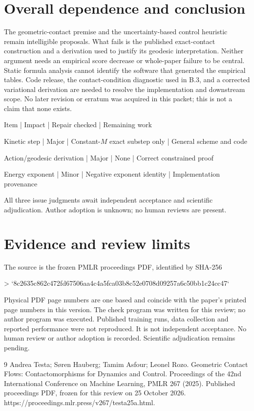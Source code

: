 \documentclass[10pt]{article}
\begin{document}
\section*{Overall dependence and conclusion}
The geometric-contact premise and the uncertainty-based control heuristic remain intelligible proposals. What fails is the published exact-contact construction and a derivation used to justify its geodesic interpretation. Neither argument needs an empirical score decrease or whole-paper failure to be central. Static formula analysis cannot identify the software that generated the empirical tables. Code release, the contact-condition diagnostic used in B.3, and a corrected variational derivation are needed to resolve the implementation and downstream scope. No later revision or erratum was acquired in this packet; this is not a claim that none exists.\par
Item | Impact | Repair checked | Remaining work\par
Kinetic step | Major | Constant-\(M\) exact substep only | General scheme and code\par
Action/geodesic derivation | Major | None | Correct constrained proof\par
Energy exponent | Minor | Negative exponent identity | Implementation provenance\par
All three issue judgments await independent acceptance and scientific adjudication. Author adoption is unknown; no human reviews are present.\par
\section*{Evidence and review limits}
The source is the frozen PMLR proceedings PDF, identified by SHA-256\par
> `8c2635c862c472fd67506aa4c4a5fca03b8c52e0708d09257a6c50bb1c24cc47`\par
Physical PDF page numbers are one based and coincide with the paper’s printed page numbers in this version. The check program was written for this review; no author program was executed. Published training runs, data collection and reported performance were not reproduced. It is not independent acceptance. No human review or author adoption is recorded. Scientific adjudication remains pending.\par
9 Andrea Testa; Søren Hauberg; Tamim Asfour; Leonel Rozo. Geometric Contact Flows: Contactomorphisms for Dynamics and Control. Proceedings of the 42nd International Conference on Machine Learning, PMLR 267 (2025). Published proceedings PDF, frozen for this review on 25 October 2026. https://proceedings.mlr.press/v267/testa25a.html.\par
\end{document}
